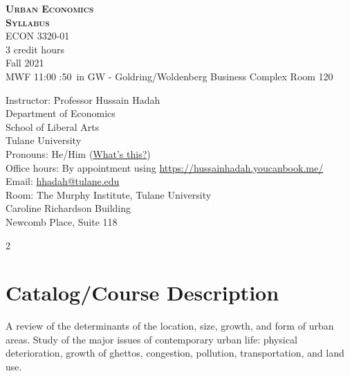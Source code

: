 \documentclass[11pt,letterpaper,final]{article}
\begin{document}
 \singlespacing

\begin{center}
	{\bf\scshape\LARGE Urban Economics \\Syllabus\\} \normalsize
ECON 3320-01 \\ 
3 credit hours \\
Fall 2021\\
MWF 11:00 :50\AM\ in GW - Goldring/Woldenberg Business Complex Room 120
\end{center}


\begin{tabbing}
	Instructor: \hspace{0.5cm} \= Professor Hussain Hadah \\ \kill 
	\> Department of Economics\\
	\> School of Liberal Arts \\
	\> Tulane University\\
		Pronouns: \> He/Him (\href{https://www.mypronouns.org/}{What's this?}) \\
	Office hours: \> By appointment using \href{https://hussainhadah.youcanbook.me/}{https://hussainhadah.youcanbook.me/} \\
	Email: \> \href{mailto:hhadah@tulane.edu}{hhadah@tulane.edu}\\
		Room: \> The Murphy Institute, Tulane University \\ \> Caroline Richardson Building  \\  Newcomb Place, Suite 118\\
\end{tabbing}

\begin{multicols}{2}
  \tableofcontents
\end{multicols}

\newpage

\section{Catalog/Course Description}
A review of the determinants of the location, size, growth, and form of urban areas. Study of the major issues of contemporary urban life: physical deterioration, growth of ghettos, congestion, pollution, transportation, and land use.
\end{document}
